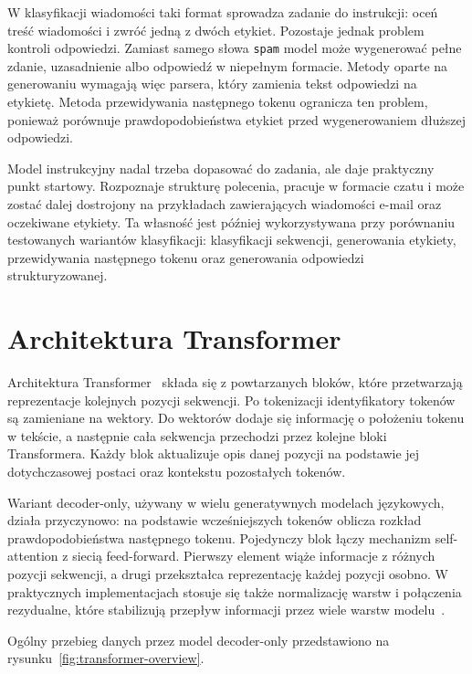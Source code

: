 W klasyfikacji wiadomości taki format sprowadza zadanie do instrukcji:
oceń treść wiadomości i zwróć jedną z dwóch etykiet.
Pozostaje jednak problem kontroli odpowiedzi. Zamiast samego słowa
\texttt{spam} model może wygenerować pełne zdanie, uzasadnienie albo odpowiedź w
niepełnym formacie. Metody oparte na generowaniu wymagają więc parsera, który
zamienia tekst odpowiedzi na etykietę. Metoda przewidywania następnego tokenu
ogranicza ten problem, ponieważ porównuje prawdopodobieństwa etykiet przed
wygenerowaniem dłuższej odpowiedzi.

Model instrukcyjny nadal trzeba dopasować do zadania, ale daje praktyczny punkt
startowy. Rozpoznaje strukturę polecenia, pracuje w formacie czatu i
może zostać dalej dostrojony na przykładach zawierających wiadomości e-mail oraz
oczekiwane etykiety. Ta własność jest później wykorzystywana przy porównaniu
testowanych wariantów klasyfikacji: klasyfikacji sekwencji, generowania etykiety,
przewidywania następnego tokenu oraz generowania odpowiedzi strukturyzowanej.

\pagebreak

\section{Architektura Transformer}

Architektura Transformer~\autocite{vaswani-attention-is-all-you-need} składa się
z powtarzanych bloków, które przetwarzają reprezentacje kolejnych pozycji
sekwencji. Po tokenizacji identyfikatory tokenów są zamieniane na wektory. Do
wektorów dodaje się informację o położeniu tokenu w tekście, a następnie cała
sekwencja przechodzi przez kolejne bloki Transformera. Każdy blok aktualizuje
opis danej pozycji na podstawie jej dotychczasowej postaci oraz kontekstu
pozostałych tokenów.

Wariant decoder-only, używany w wielu generatywnych modelach językowych, działa
przyczynowo: na podstawie wcześniejszych tokenów oblicza rozkład
prawdopodobieństwa następnego tokenu. Pojedynczy blok łączy mechanizm
self-attention z siecią feed-forward. Pierwszy element wiąże informacje z różnych
pozycji sekwencji, a drugi przekształca reprezentację każdej pozycji osobno. W
praktycznych implementacjach stosuje się także normalizację warstw i połączenia
rezydualne, które stabilizują przepływ informacji przez wiele warstw
modelu~\autocite{vaswani-attention-is-all-you-need}.

Ogólny przebieg danych przez model decoder-only przedstawiono na
rysunku~\ref{fig:transformer-overview}.

